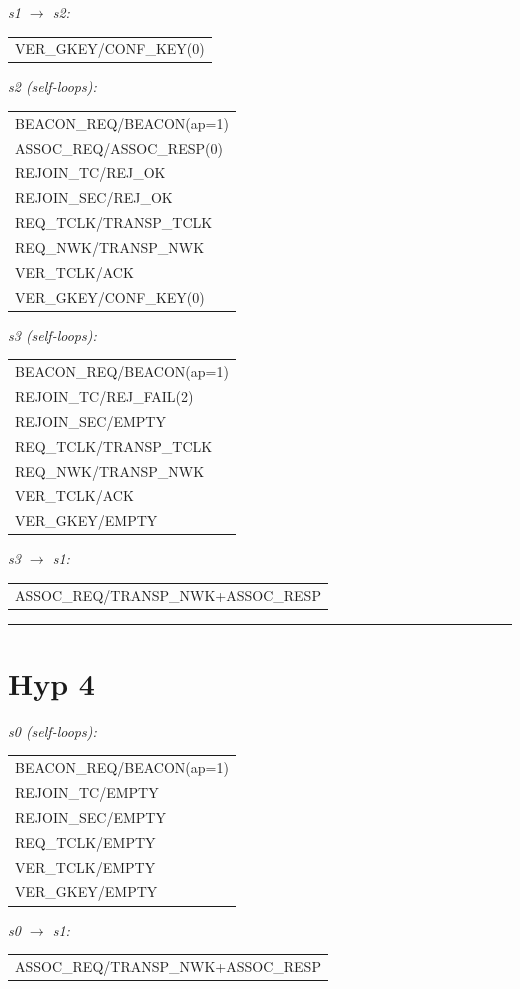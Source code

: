 \documentclass[10pt]{article}
\makeatletter
\newcommand{\iolist}[1]{%
  \ttfamily\small
  \begin{tabular}{@{}l@{}}
  #1
  \end{tabular}%
  \rmfamily
}
\makeatother
\begin{document}
\medskip
\noindent\textit{s1 $\to$ s2:}\\[2pt]
\iolist{%
VER\_GKEY/CONF\_KEY(0)\\
}

\medskip
\noindent\textit{s2 (self-loops):}\\[2pt]
\iolist{%
BEACON\_REQ/BEACON(ap=1)\\
ASSOC\_REQ/ASSOC\_RESP(0)\\
REJOIN\_TC/REJ\_OK\\
REJOIN\_SEC/REJ\_OK\\
REQ\_TCLK/TRANSP\_TCLK\\
REQ\_NWK/TRANSP\_NWK\\
VER\_TCLK/ACK\\
VER\_GKEY/CONF\_KEY(0)\\
}

\medskip
\noindent\textit{s3 (self-loops):}\\[2pt]
\iolist{%
BEACON\_REQ/BEACON(ap=1)\\
REJOIN\_TC/REJ\_FAIL(2)\\
REJOIN\_SEC/EMPTY\\
REQ\_TCLK/TRANSP\_TCLK\\
REQ\_NWK/TRANSP\_NWK\\
VER\_TCLK/ACK\\
VER\_GKEY/EMPTY\\
}

\medskip
\noindent\textit{s3 $\to$ s1:}\\[2pt]
\iolist{%
ASSOC\_REQ/TRANSP\_NWK+ASSOC\_RESP\\
}

\bigskip\hrule

\section*{Hyp 4}

\noindent\textit{s0 (self-loops):}\\[2pt]
\iolist{%
BEACON\_REQ/BEACON(ap=1)\\
REJOIN\_TC/EMPTY\\
REJOIN\_SEC/EMPTY\\
REQ\_TCLK/EMPTY\\
VER\_TCLK/EMPTY\\
VER\_GKEY/EMPTY\\
}

\medskip
\noindent\textit{s0 $\to$ s1:}\\[2pt]
\iolist{%
ASSOC\_REQ/TRANSP\_NWK+ASSOC\_RESP\\
}
\end{document}
